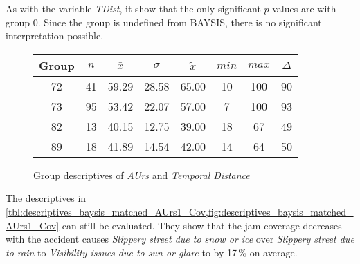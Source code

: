 As with the variable \textit{TDist}, it show that the only significant $p$-values are with group 0. Since the group is undefined from BAYSIS, there is no significant interpretation possible.
\begin{figure}[ht!]
	\centering
	\begin{minipage}{0.5\textwidth}
		\tiny
		\setlength{\tabcolsep}{4pt}
		\centering
		\begin{tabular}{c|c|c|c|c|c|c|c}
			\toprule
			Group & $n$ & $\bar{x}$ & $\sigma$ & $\tilde{x}$ & $min$ & $max$ & $\Delta$ \\
			\midrule
			72 & 41 & 59.29 & 28.58 & 65.00 & 10 & 100 & 90 \\ 
			73 & 95 & 53.42 & 22.07 & 57.00 & 7  & 100 & 93 \\ 
			82 & 13 & 40.15 & 12.75 & 39.00 & 18 & 67  & 49 \\ 
			89 & 18 & 41.89 & 14.54 & 42.00 & 14 & 64  & 50 \\ 
			\bottomrule
		\end{tabular}
		\label{tbl:descriptives_baysis_matched_AUrs1_Cov}
	\end{minipage}%
	\begin{minipage}{0.55\textwidth}
		\data 
        \pgfplotstablesort[sort key=mean, sort cmp=float >]{\datasorted}{\data}
        \tiny
        \centering
		\label{fig:descriptives_baysis_matched_AUrs1_Cov}
	\end{minipage}%
	\caption{Group descriptives of \textit{AUrs} and \textit{Temporal Distance}}
\end{figure}
The descriptives in \cref{tbl:descriptives_baysis_matched_AUrs1_Cov,fig:descriptives_baysis_matched_AUrs1_Cov} can still be evaluated. They show that the jam coverage decreases with the accident causes \textit{Slippery street due to snow or ice} over \textit{Slippery street due to rain} to \textit{Visibility issues due to sun or glare} to by 17\,\% on average.

